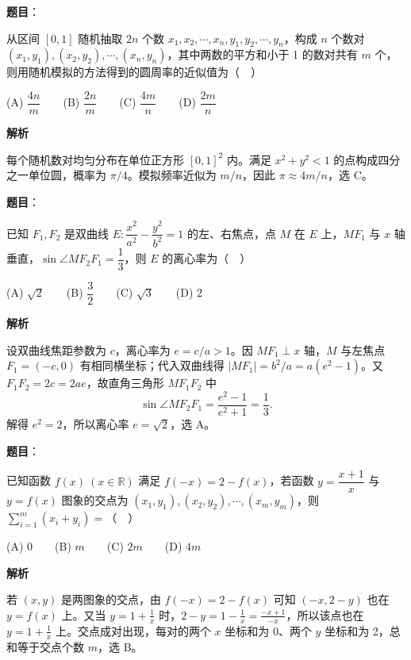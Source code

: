 \begin{answer}

\textbf{题目}：

从区间 \([0,1]\) 随机抽取 \(2n\) 个数 \(x_1,\allowbreak x_2,\allowbreak\cdots,\allowbreak x_n,\allowbreak y_1,\allowbreak y_2,\allowbreak\cdots,\allowbreak y_n\)，构成 \(n\) 个数对 \((x_1,y_1),\allowbreak(x_2,y_2),\allowbreak\cdots,\allowbreak(x_n,y_n)\)，其中两数的平方和小于 1 的数对共有 \(m\) 个，则用随机模拟的方法得到的圆周率的近似值为（　）

   (A) \(\dfrac{4n}{m}\)　　(B) \(\dfrac{2n}{m}\)　　(C) \(\dfrac{4m}{n}\)　　(D) \(\dfrac{2m}{n}\)

\textbf{解析}

每个随机数对均匀分布在单位正方形 \([0,1]^2\) 内。满足 \(x^2+y^2<1\) 的点构成四分之一单位圆，概率为 \(\pi/4\)。模拟频率近似为 \(m/n\)，因此 \(\pi\approx4m/n\)，选 C。


\end{answer}
\begin{answer}

\textbf{题目}：

已知 \(F_1,F_2\) 是双曲线 \(E:\dfrac{x^2}{a^2}-\dfrac{y^2}{b^2}=1\) 的左、右焦点，点 \(M\) 在 \(E\) 上，\(MF_1\) 与 \(x\) 轴垂直，\(\sin\angle MF_2F_1=\dfrac13\)，则 \(E\) 的离心率为（　）

   (A) \(\sqrt2\)　　(B) \(\dfrac32\)　　(C) \(\sqrt3\)　　(D) \(2\)

\textbf{解析}

设双曲线焦距参数为 \(c\)，离心率为 \(e=c/a>1\)。因 \(MF_1\perp x\) 轴，\(M\) 与左焦点 \(F_1=(-c,0)\) 有相同横坐标；代入双曲线得 \(|MF_1|=b^2/a=a(e^2-1)\)。又 \(F_1F_2=2c=2ae\)，故直角三角形 \(MF_1F_2\) 中
\nopagebreak[4]
\[
\sin\angle MF_2F_1=\frac{e^2-1}{e^2+1}=\frac13.
\]
解得 \(e^2=2\)，所以离心率 \(e=\sqrt2\)，选 A。


\end{answer}
\begin{answer}

\textbf{题目}：

已知函数 \(f(x)\ (x\in\mathbb R)\) 满足 \(f(-x)=2-f(x)\)，若函数 \(y=\dfrac{x+1}{x}\) 与 \(y=f(x)\) 图象的交点为 \((x_1,y_1),(x_2,y_2),\cdots,(x_m,y_m)\)，则 \(\displaystyle\sum_{i=1}^m(x_i+y_i)=\)（　）

   (A) 0　　(B) \(m\)　　(C) \(2m\)　　(D) \(4m\)

\textbf{解析}

若 \((x,y)\) 是两图象的交点，由 \(f(-x)=2-f(x)\) 可知 \((-x,2-y)\) 也在 \(y=f(x)\) 上。又当 \(y=1+\frac1x\) 时，\(2-y=1-\frac1x=\frac{-x+1}{-x}\)，所以该点也在 \(y=1+\frac1x\) 上。交点成对出现，每对的两个 \(x\) 坐标和为 0、两个 \(y\) 坐标和为 2，总和等于交点个数 \(m\)，选 B。


\end{answer}

